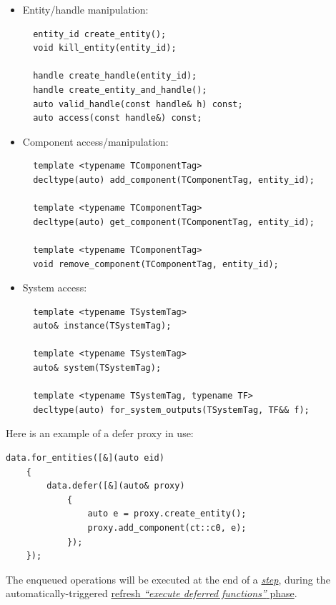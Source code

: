 \documentclass[oneside, 12pt, a4paper, openany]{book}
\begin{document}
\begin{itemize}
\item
  Entity/handle manipulation:

  \begin{verbatim}
  entity_id create_entity();
  void kill_entity(entity_id);

  handle create_handle(entity_id);
  handle create_entity_and_handle();
  auto valid_handle(const handle& h) const;
  auto access(const handle&) const;
  \end{verbatim}
\item
  Component access/manipulation:

  \begin{verbatim}
  template <typename TComponentTag>
  decltype(auto) add_component(TComponentTag, entity_id);

  template <typename TComponentTag>
  decltype(auto) get_component(TComponentTag, entity_id);

  template <typename TComponentTag>
  void remove_component(TComponentTag, entity_id);
  \end{verbatim}
\item
  System access:

  \begin{verbatim}
  template <typename TSystemTag>
  auto& instance(TSystemTag);

  template <typename TSystemTag>
  auto& system(TSystemTag);

  template <typename TSystemTag, typename TF>
  decltype(auto) for_system_outputs(TSystemTag, TF&& f);
  \end{verbatim}
\end{itemize}

Here is an example of a defer proxy in use:

\begin{verbatim}
data.for_entities([&](auto eid)
    {
        data.defer([&](auto& proxy)
            {
                auto e = proxy.create_entity();
                proxy.add_component(ct::c0, e);
            });
    });
\end{verbatim}

The enqueued operations will be executed at the end of a
\protect\hyperlink{step_stage}{\emph{step}}, during the
automatically-triggered \protect\hyperlink{flow_exec_dfuncs}{refresh
\emph{``execute deferred functions''} phase}.
\end{document}
